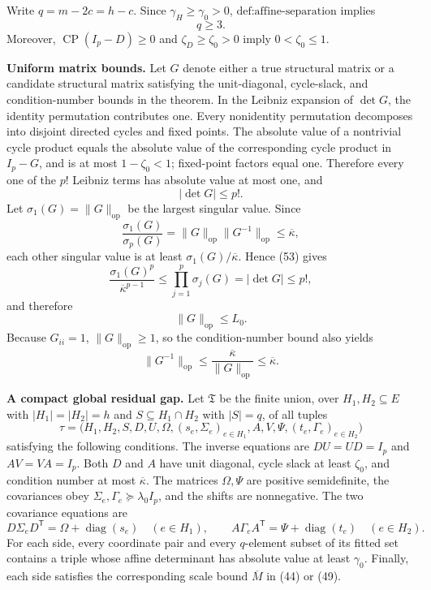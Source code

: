 Write \(q=m-2c=h-c\). Since \(\gamma_H\geq\gamma_0>0\), \(\text{def:affine-separation}\) implies
\[
q\geq3.
\tag{52}
\]
Moreover, \(\operatorname{CP}(I_p-D)\geq0\) and \(\zeta_D\geq\zeta_0>0\) imply \(0<\zeta_0\leq1\).

\textbf{Uniform matrix bounds.}
Let \(G\) denote either a true structural matrix or a candidate structural matrix satisfying the unit-diagonal, cycle-slack, and condition-number bounds in the theorem. In the Leibniz expansion of \(\det G\), the identity permutation contributes one. Every nonidentity permutation decomposes into disjoint directed cycles and fixed points. The absolute value of a nontrivial cycle product equals the absolute value of the corresponding cycle product in \(I_p-G\), and is at most \(1-\zeta_0<1\); fixed-point factors equal one. Therefore every one of the \(p!\) Leibniz terms has absolute value at most one, and
\[
|\det G|\leq p!.
\tag{53}
\]
Let \(\sigma_1(G)=\|G\|_{\mathrm{op}}\) be the largest singular value. Since
\[
\frac{\sigma_1(G)}{\sigma_p(G)}
=\|G\|_{\mathrm{op}}\|G^{-1}\|_{\mathrm{op}}
\leq\overline\kappa,
\]
each other singular value is at least \(\sigma_1(G)/\overline\kappa\). Hence (53) gives
\[
\frac{\sigma_1(G)^p}{\overline\kappa^{p-1}}
\leq\prod_{j=1}^p\sigma_j(G)
=|\det G|
\leq p!,
\]
and therefore
\[
\|G\|_{\mathrm{op}}\leq L_0.
\tag{54}
\]
Because \(G_{ii}=1\), \(\|G\|_{\mathrm{op}}\geq1\), so the condition-number bound also yields
\[
\|G^{-1}\|_{\mathrm{op}}
\leq\frac{\overline\kappa}{\|G\|_{\mathrm{op}}}
\leq\overline\kappa.
\tag{55}
\]

\textbf{A compact global residual gap.}
Let \(\mathfrak T\) be the finite union, over \(H_1,H_2\subseteq E\) with \(|H_1|=|H_2|=h\) and \(S\subseteq H_1\cap H_2\) with \(|S|=q\), of all tuples
\[
\tau=\bigl(H_1,H_2,S,D,U,\Omega,(s_e,\Sigma_e)_{e\in H_1},
A,V,\Psi,(t_e,\Gamma_e)_{e\in H_2}\bigr)
\tag{56}
\]
satisfying the following conditions. The inverse equations are \(DU=UD=I_p\) and \(AV=VA=I_p\). Both \(D\) and \(A\) have unit diagonal, cycle slack at least \(\zeta_0\), and condition number at most \(\overline\kappa\). The matrices \(\Omega,\Psi\) are positive semidefinite, the covariances obey \(\Sigma_e,\Gamma_e\succeq\lambda_0I_p\), and the shifts are nonnegative. The two covariance equations are
\[
D\Sigma_eD^{\mathsf T}=\Omega+\operatorname{diag}(s_e)\quad(e\in H_1),
\qquad
A\Gamma_eA^{\mathsf T}=\Psi+\operatorname{diag}(t_e)\quad(e\in H_2).
\tag{57}
\]
For each side, every coordinate pair and every \(q\)-element subset of its fitted set contains a triple whose affine determinant has absolute value at least \(\gamma_0\). Finally, each side satisfies the corresponding scale bound \(\overline M\) in (44) or (49).

